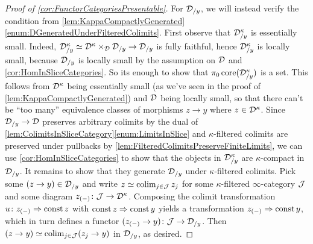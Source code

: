 \begin{proof}[Proof of \cref{cor:FunctorCategoriesPresentable}]
	For $\mathcal{D}_{/y}$, we will instead verify the condition from \cref{lem:KappaCompactlyGenerated}\cref{enum:DGeneratedUnderFilteredColimits}. First observe that $\mathcal{D}^\kappa_{/y}$ is essentially small. Indeed, $\mathcal{D}^\kappa_{/y}\simeq \mathcal{D}^\kappa\times_{\mathcal{D}}\mathcal{D}_{/y}\rightarrow \mathcal{D}_{/y}$ is fully faithful, hence $\mathcal{D}^\kappa_{/y}$ is locally small, because $\mathcal{D}_{/y}$ is locally small by the assumption on $\mathcal{D}$ and \cref{cor:HomInSliceCategories}. So its enough to show that $\pi_0\operatorname{core}(\mathcal{D}^\kappa_{/y})$ is a set. This follows from $\mathcal{D}^\kappa$ being essentially small (as we've seen in the proof of \cref{lem:KappaCompactlyGenerated}) and $\mathcal{D}$ being locally small, so that there can't be \enquote{too many} equivalence classes of morphisms $z\rightarrow y$ where $z\in\mathcal{D}^\kappa$. Since $\mathcal{D}_{/y}\rightarrow\mathcal{D}$ preserves arbitrary colimits by the dual of \cref{lem:ColimitsInSliceCategory}\cref{enum:LimitsInSlice} and $\kappa$-filtered colimits are preserved under pullbacks by \cref{lem:FilteredColimitsPreserveFiniteLimits}, we can use \cref{cor:HomInSliceCategories} to show that the objects in $\mathcal{D}^\kappa_{/y}$ are $\kappa$-compact in $\mathcal{D}_{/y}$. It remains to show that they generate $\mathcal{D}_{/y}$ under $\kappa$-filtered colimits. Pick some $(z\rightarrow y)\in\mathcal{D}_{/y}$ and write $z\simeq\operatorname*{colim}_{j\in\mathcal{J}}z_j$ for some $\kappa$-filtered $\infty$-category $\mathcal{J}$ and some diagram $z_{(-)}\colon\mathcal{J}\rightarrow\mathcal{D}^\kappa$. Composing the colimit transformation $u\colon z_{(-)}\Rightarrow \operatorname{const} z$ with $\operatorname{const} z\Rightarrow \operatorname{const} y$ yields a transformation $z_{(-)}\Rightarrow \operatorname{const} y$, which in turn defines a functor $(z_{(-)}\rightarrow y)\colon \mathcal{J}\rightarrow \mathcal{D}_{/y}$. Then $(z\rightarrow y)\simeq \operatorname*{colim}_{j\in\mathcal{J}}(z_j\rightarrow y)$ in $\mathcal{D}_{/y}$, as desired.
\end{proof}

